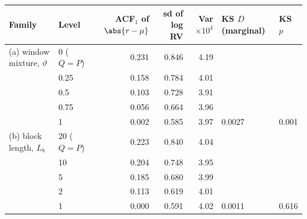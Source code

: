 \begin{tabular}{llrrrll}
\toprule
Family & Level & ACF$_1$ of $\abs{r-\mu}$ & sd of log RV & Var $\times10^4$ & KS $D$ (marginal) & KS $p$ \\
\midrule
(a) window mixture, $\vartheta$ & 0 ($Q=P$) & 0.231 & 0.846 & 4.19 &  &  \\
 & 0.25 & 0.158 & 0.784 & 4.01 &  &  \\
 & 0.5 & 0.103 & 0.728 & 3.91 &  &  \\
 & 0.75 & 0.056 & 0.664 & 3.96 &  &  \\
 & 1 & 0.002 & 0.585 & 3.97 & 0.0027 & 0.001 \\
\addlinespace[2pt]
(b) block length, $L_b$ & 20 ($Q=P$) & 0.223 & 0.840 & 4.04 &  &  \\
 & 10 & 0.204 & 0.748 & 3.95 &  &  \\
 & 5 & 0.185 & 0.680 & 3.99 &  &  \\
 & 2 & 0.113 & 0.619 & 4.01 &  &  \\
 & 1 & 0.000 & 0.591 & 4.02 & 0.0011 & 0.616 \\
\bottomrule
\end{tabular}
